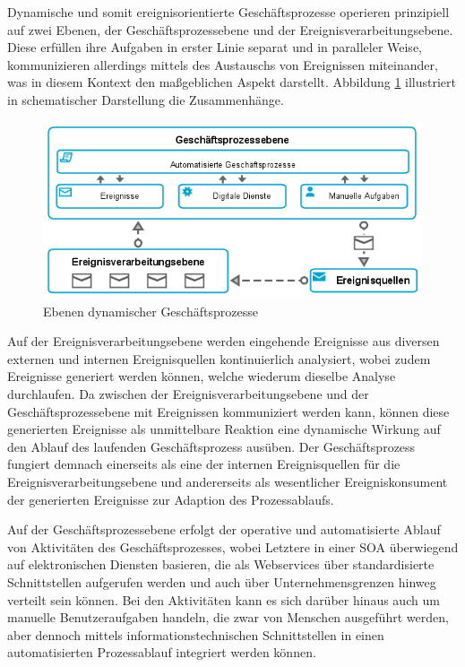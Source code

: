 Dynamische und somit ereignisorientierte Geschäftsprozesse operieren prinzipiell auf zwei Ebenen, der Geschäftsprozessebene und der Ereignisverarbeitungsebene. 
Diese erfüllen ihre Aufgaben in erster Linie separat und in paralleler Weise, kommunizieren allerdings mittels des Austauschs von Ereignissen miteinander, was in diesem Kontext den maßgeblichen Aspekt darstellt. 
Abbildung \ref{fig:Ebenen dynamischer Geschäftsprozesse} illustriert in schematischer Darstellung die Zusammenhänge.

\begin{figure}[H]
	\centering 
    \includegraphics[width=\textwidth]{img/dynamicbp.png}	
    \caption[Ebenen dynamischer Geschäftsprozesse]
    {Ebenen dynamischer Geschäftsprozesse \protect\footnotemark}
    \label{fig:Ebenen dynamischer Geschäftsprozesse}
\end{figure}

Auf der Ereignisverarbeitungsebene werden eingehende Ereignisse aus diversen externen und internen Ereignisquellen kontinuierlich analysiert, wobei zudem Ereignisse generiert werden können, welche wiederum dieselbe Analyse durchlaufen. 
Da zwischen der Ereignisverarbeitungsebene und der Geschäftsprozessebene mit Ereignissen kommuniziert werden kann, können diese generierten Ereignisse als unmittelbare Reaktion eine dynamische Wirkung auf den Ablauf des laufenden Geschäftsprozess ausüben.
Der Geschäftsprozess fungiert demnach einerseits als eine der internen Ereignisquellen für die Ereignisverarbeitungsebene und andererseits als wesentlicher Ereigniskonsument der generierten Ereignisse zur Adaption des Prozessablaufs.
\cite{Benker.2016}

Auf der Geschäftsprozessebene erfolgt der operative und automatisierte Ablauf von Aktivitäten des Geschäftsprozesses, wobei Letztere in einer \ac{SOA} überwiegend auf elektronischen Diensten basieren, die als Webservices über standardisierte Schnittstellen aufgerufen werden und auch über Unternehmensgrenzen hinweg verteilt sein können.
\cite{Finger.2009}
Bei den Aktivitäten kann es sich darüber hinaus auch um manuelle Benutzeraufgaben handeln, die zwar von Menschen ausgeführt werden, aber dennoch mittels informationstechnischen Schnittstellen in einen automatisierten Prozessablauf integriert werden können.
\cite{Bruns.2010}


